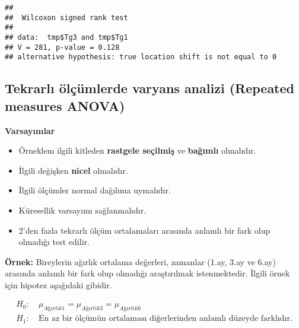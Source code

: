 \documentclass[
]{article}
\newenvironment{Shaded}{\begin{snugshade}}{\end{snugshade}}
\newcommand{\AttributeTok}[1]{\textcolor[rgb]{0.77,0.63,0.00}{#1}}
\newcommand{\CommentTok}[1]{\textcolor[rgb]{0.56,0.35,0.01}{\textit{#1}}}
\newcommand{\ConstantTok}[1]{\textcolor[rgb]{0.00,0.00,0.00}{#1}}
\newcommand{\DecValTok}[1]{\textcolor[rgb]{0.00,0.00,0.81}{#1}}
\newcommand{\FunctionTok}[1]{\textcolor[rgb]{0.00,0.00,0.00}{#1}}
\newcommand{\NormalTok}[1]{#1}
\newcommand{\SpecialCharTok}[1]{\textcolor[rgb]{0.00,0.00,0.00}{#1}}
\newcommand{\StringTok}[1]{\textcolor[rgb]{0.31,0.60,0.02}{#1}}
\providecommand{\tightlist}{%
  \setlength{\itemsep}{0pt}\setlength{\parskip}{0pt}}
\begin{document}
\begin{Shaded}
\end{Shaded}

\begin{verbatim}
## 
##  Wilcoxon signed rank test
## 
## data:  tmp$Tg3 and tmp$Tg1
## V = 281, p-value = 0.128
## alternative hypothesis: true location shift is not equal to 0
\end{verbatim}

\hypertarget{tekrarlux131-uxf6luxe7uxfcmlerde-varyans-analizi-repeated-measures-anova}{%
\subsection{Tekrarlı ölçümlerde varyans analizi (Repeated measures
ANOVA)}\label{tekrarlux131-uxf6luxe7uxfcmlerde-varyans-analizi-repeated-measures-anova}}

\textbf{Varsayımlar}

\begin{itemize}
\tightlist
\item
  Örneklem ilgili kitleden \textbf{rastgele seçilmiş} ve
  \textbf{bağımlı} olmalıdır.
\item
  İlgili değişken \textbf{nicel} olmalıdır.
\item
  İlgili ölçümler normal dağılıma uymalıdır.
\item
  Küresellik varsayımı sağlanmalıdır.
\item
  2'den fazla tekrarlı ölçüm ortalamaları arasında anlamlı bir fark olup
  olmadığı test edilir.
\end{itemize}

\textbf{Örnek:} Bireylerin ağırlık ortalama değerleri, zamanlar (1.ay,
3.ay ve 6.ay) arasında anlamlı bir fark olup olmadığı araştırılmak
istenmektedir. İlgili örnek için hipotez aşağıdaki gibidir.

\begin{align*}
  H_0:&~ \mu_{Ağırlık1} = \mu_{Ağırlık3} = \mu_{Ağırlık6} \\
  H_1:&~ \text{En az bir ölçümün ortalaması diğerlerinden anlamlı düzeyde farklıdır.}
\end{align*}
\end{document}
